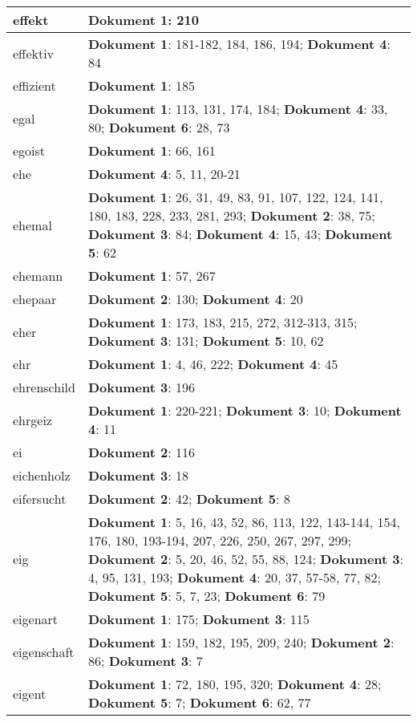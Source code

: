 \documentclass[a5paper]{article}
\begin{document}
\begin{longtable}[l]{|l|p{3in}|}
\hline
effekt & \textbf{Dokument 1}: 210 \\
\hline
effektiv & \textbf{Dokument 1}: 181-182, 184, 186, 194; \textbf{Dokument 4}: 84 \\
\hline
effizient & \textbf{Dokument 1}: 185 \\
\hline
egal & \textbf{Dokument 1}: 113, 131, 174, 184; \textbf{Dokument 4}: 33, 80; \textbf{Dokument 6}: 28, 73 \\
\hline
egoist & \textbf{Dokument 1}: 66, 161 \\
\hline
ehe & \textbf{Dokument 4}: 5, 11, 20-21 \\
\hline
ehemal & \textbf{Dokument 1}: 26, 31, 49, 83, 91, 107, 122, 124, 141, 180, 183, 228, 233, 281, 293; \textbf{Dokument 2}: 38, 75; \textbf{Dokument 3}: 84; \textbf{Dokument 4}: 15, 43; \textbf{Dokument 5}: 62 \\
\hline
ehemann & \textbf{Dokument 1}: 57, 267 \\
\hline
ehepaar & \textbf{Dokument 2}: 130; \textbf{Dokument 4}: 20 \\
\hline
eher & \textbf{Dokument 1}: 173, 183, 215, 272, 312-313, 315; \textbf{Dokument 3}: 131; \textbf{Dokument 5}: 10, 62 \\
\hline
ehr & \textbf{Dokument 1}: 4, 46, 222; \textbf{Dokument 4}: 45 \\
\hline
ehrenschild & \textbf{Dokument 3}: 196 \\
\hline
ehrgeiz & \textbf{Dokument 1}: 220-221; \textbf{Dokument 3}: 10; \textbf{Dokument 4}: 11 \\
\hline
ei & \textbf{Dokument 2}: 116 \\
\hline
eichenholz & \textbf{Dokument 3}: 18 \\
\hline
eifersucht & \textbf{Dokument 2}: 42; \textbf{Dokument 5}: 8 \\
\hline
eig & \textbf{Dokument 1}: 5, 16, 43, 52, 86, 113, 122, 143-144, 154, 176, 180, 193-194, 207, 226, 250, 267, 297, 299; \textbf{Dokument 2}: 5, 20, 46, 52, 55, 88, 124; \textbf{Dokument 3}: 4, 95, 131, 193; \textbf{Dokument 4}: 20, 37, 57-58, 77, 82; \textbf{Dokument 5}: 5, 7, 23; \textbf{Dokument 6}: 79 \\
\hline
eigenart & \textbf{Dokument 1}: 175; \textbf{Dokument 3}: 115 \\
\hline
eigenschaft & \textbf{Dokument 1}: 159, 182, 195, 209, 240; \textbf{Dokument 2}: 86; \textbf{Dokument 3}: 7 \\
\hline
eigent & \textbf{Dokument 1}: 72, 180, 195, 320; \textbf{Dokument 4}: 28; \textbf{Dokument 5}: 7; \textbf{Dokument 6}: 62, 77 \\

\end{longtable}
\end{document}
